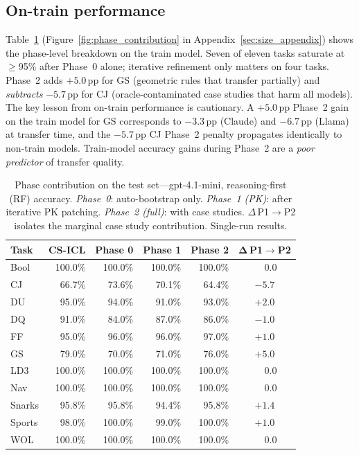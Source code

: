 \documentclass{article}
\begin{document}
\subsection{On-train performance}

\label{sec:overall}

Table~\ref{tab:phase_contribution} (Figure~\ref{fig:phase_contribution} in
Appendix~\ref{sec:size_appendix}) shows the phase-level breakdown on the train model.
Seven of eleven tasks saturate at $\geq$95\% after Phase~0 alone; iterative refinement only
matters on four tasks.
Phase~2 adds $+5.0$\,pp for GS (geometric rules that transfer partially) and
\emph{subtracts} $-5.7$\,pp for CJ (oracle-contaminated case studies that harm all models).
The key lesson from on-train performance is cautionary.
A $+5.0$\,pp Phase~2 gain on the train model for GS corresponds to $-3.3$\,pp (Claude) and $-6.7$\,pp (Llama) at transfer
time, and the $-5.7$\,pp CJ Phase~2 penalty propagates identically to non-train models.
Train-model accuracy gains during Phase~2 are a \emph{poor predictor} of transfer quality.

\begin{table}[t]
  \caption{Phase contribution on the test set---gpt-4.1-mini, reasoning-first (RF) accuracy.
    \textit{Phase~0}: auto-bootstrap only. \textit{Phase~1 (PK)}: after iterative PK patching.
    \textit{Phase~2 (full)}: with case studies. $\Delta$\,P1$\!\to$P2 isolates the marginal
    case study contribution. Single-run results.}
  \label{tab:phase_contribution}
  \centering
  \smallskip
  \begin{tabular}{lrrrrc}
    \toprule
    \textbf{Task}
      & \textbf{CS-ICL}
      & \textbf{Phase 0}
      & \textbf{Phase 1}
      & \textbf{Phase 2}
      & $\boldsymbol{\Delta}$\,\textbf{P1$\!\to$\!P2} \\
    \midrule
    Bool   & 100.0\% & 100.0\% & 100.0\% & 100.0\% & $\phantom{+}0.0$ \\
    CJ     &  66.7\% &  73.6\% &  70.1\% &  64.4\% & $-5.7$ \\
    DU     &  95.0\% &  94.0\% &  91.0\% &  93.0\% & $+2.0$ \\
    DQ     &  91.0\% &  84.0\% &  87.0\% &  86.0\% & $-1.0$ \\
    FF     &  95.0\% &  96.0\% &  96.0\% &  97.0\% & $+1.0$ \\
    GS     &  79.0\% &  70.0\% &  71.0\% &  76.0\% & $\mathbf{+5.0}$ \\
    LD3    & 100.0\% & 100.0\% & 100.0\% & 100.0\% & $\phantom{+}0.0$ \\
    Nav    & 100.0\% & 100.0\% & 100.0\% & 100.0\% & $\phantom{+}0.0$ \\
    Snarks &  95.8\% &  95.8\% &  94.4\% &  95.8\% & $+1.4$ \\
    Sports &  98.0\% & 100.0\% &  99.0\% & 100.0\% & $+1.0$ \\
    WOL    & 100.0\% & 100.0\% & 100.0\% & 100.0\% & $\phantom{+}0.0$ \\
    \bottomrule
  \end{tabular}
\end{table}
\end{document}

